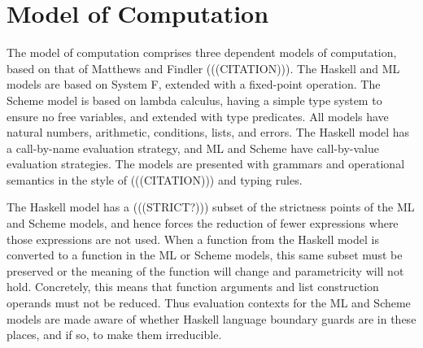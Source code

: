 \newcommand{\haskell}{Haskell model\xspace}
\newcommand{\ml}{ML model\xspace}
\newcommand{\scheme}{Scheme model\xspace}

\newcommand{\haskellml}{Haskell and ML models\xspace}
\newcommand{\haskellmlscheme}{Haskell, ML, and Scheme models\xspace}

\newcommand{\articlehaskell}[1]{#1 \haskell}
\newcommand{\articleml}[1]{#1 \ml}
\newcommand{\articlescheme}[1]{#1 \scheme}

\newcommand{\articlehaskellml}[1]{#1 \haskellml}
\newcommand{\articlehaskellmlscheme}[1]{#1 \haskellmlscheme}

\newcommand{\thehaskell}{\articlehaskell{the}}
\newcommand{\Thehaskell}{\articlehaskell{The}}
\newcommand{\theml}{\articleml{the}}
\newcommand{\Theml}{\articleml{The}}
\newcommand{\thescheme}{\articlescheme{the}}
\newcommand{\Thescheme}{\articlescheme{The}}

\newcommand{\thehaskellml}{\articlehaskellml{the}}
\newcommand{\Thehaskellml}{\articlehaskellml{The}}
\newcommand{\thehaskellmlscheme}{\articlehaskellmlscheme{the}}
\newcommand{\Thehaskellmlscheme}{\articlehaskellmlscheme{The}}

\newcommand{\hastype}[1]{has the type #1}
\newcommand{\havetype}[1]{have the type #1}

\chapter{Model of Computation}

The model of computation comprises three dependent models of computation, based on that of Matthews and Findler (((CITATION))). The Haskell and ML models are based on System F, extended with a fixed-point operation. The Scheme model is based on lambda calculus, having a simple type system to ensure no free variables, and extended with type predicates. All models have natural numbers, arithmetic, conditions, lists, and errors. The Haskell model has a call-by-name evaluation strategy, and ML and Scheme have call-by-value evaluation strategies. The models are presented with grammars and operational semantics in the style of (((CITATION))) and typing rules.

The Haskell model has a (((STRICT?))) subset of the strictness points of the ML and Scheme models, and hence forces the reduction of fewer expressions where those expressions are not used. When a function from the Haskell model is converted to a function in the ML or Scheme models, this same subset must be preserved or the meaning of the function will change and parametricity will not hold. Concretely, this means that function arguments and list construction operands must not be reduced. Thus evaluation contexts for the ML and Scheme models are made aware of whether Haskell language boundary guards are in these places, and if so, to make them irreducible.

